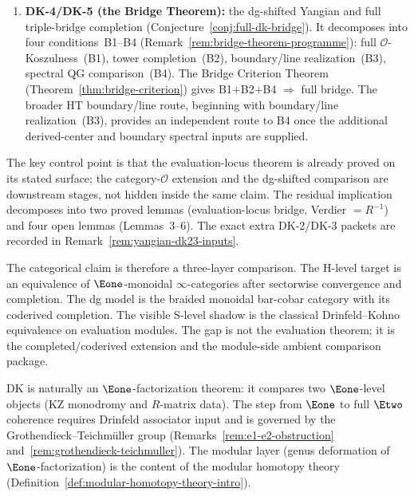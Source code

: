 \begin{remark}
\begin{enumerate}[label=\textup{(\alph*)}]
 resolves the H-level evaluation-generated core at all
 simple types via the $\infty$-categorical sectorwise convergence
 theorem \textup{(}Theorem~\ref{thm:h-level-factorization-kd}\textup{)}.
 The remaining gap to
 Conjecture~\ref{conj:derived-drinfeld-kohno} is therefore the
 completed/coderived extension beyond that proved core, together with
 the ambient extension/comparison package on the module side
 \textup{(}Corollary~\ref{cor:dk-partial-conj}\textup{)}.
\item \textbf{DK-4/DK-5 (the Bridge Theorem):} the dg-shifted Yangian and
 full triple-bridge completion
 (Conjecture~\ref{conj:full-dk-bridge}).
 It decomposes into four conditions~B1--B4
 (Remark~\ref{rem:bridge-theorem-programme}):
 full $\mathcal{O}$-Koszulness~(B1),
 tower completion~(B2),
 boundary/line realization~(B3),
 spectral QG comparison~(B4).
 The Bridge Criterion Theorem
 (Theorem~\ref{thm:bridge-criterion}) gives
 B1$+$B2$+$B4 $\Rightarrow$ full bridge.
 The broader HT boundary/line route, beginning with
 boundary/line realization~(B3), provides an independent route to B4
 once the additional derived-center and boundary spectral inputs are supplied.
\end{enumerate}
The key control point is that the evaluation-locus theorem is already
proved on its stated surface; the category-$\mathcal{O}$ extension
and the dg-shifted comparison are downstream stages, not hidden inside
the same claim.
The residual implication decomposes into
two proved lemmas (evaluation-locus bridge, Verdier $= R^{-1}$) and
four open lemmas (Lemmas~3--6).
The exact extra DK-2/DK-3 packets are recorded in
Remark~\ref{rem:yangian-dk23-inputs}.

The categorical claim is therefore a three-layer comparison. The
H-level target is an equivalence of $\Eone$-monoidal
$\infty$-categories after sectorwise convergence and completion. The
dg model is the braided monoidal bar-cobar category with its
coderived completion. The visible S-level shadow is the classical
Drinfeld--Kohno equivalence on evaluation modules. The gap is not the
evaluation theorem; it is the completed/coderived extension and the
module-side ambient comparison package.

DK is naturally an $\Eone$-factorization theorem: it compares two
$\Eone$-level objects (KZ monodromy and $R$-matrix data). The step
from $\Eone$ to full $\Etwo$ coherence requires Drinfeld associator
input and is governed by the Grothendieck--Teichm\"uller group
(Remarks~\ref{rem:e1-e2-obstruction}
and~\ref{rem:grothendieck-teichmuller}). The modular layer (genus
deformation of $\Eone$-factorization) is the content of the modular
homotopy theory
(Definition~\ref{def:modular-homotopy-theory-intro}).
\end{remark}

